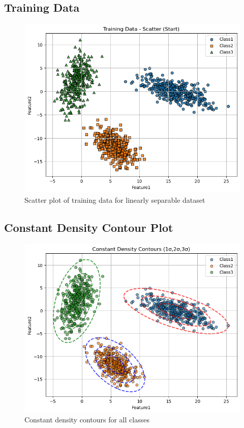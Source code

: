 \documentclass[12pt,a4paper]{article}
\begin{document}
\subsection{Training Data}
\begin{figure}[H]
    \centering
    \includegraphics[width=\linewidth]{images/LS_Group04_images/01_training data_scatter.png}
    \caption{Scatter plot of training data for linearly separable dataset}
\end{figure}

\subsection{Constant Density Contour Plot}
\begin{figure}[H]
    \centering
    \includegraphics[width=\linewidth]{images/LS_Group04_images/02_constant_density_contour.png}
    \caption{Constant density contours for all classes}
\end{figure}
\end{document}
